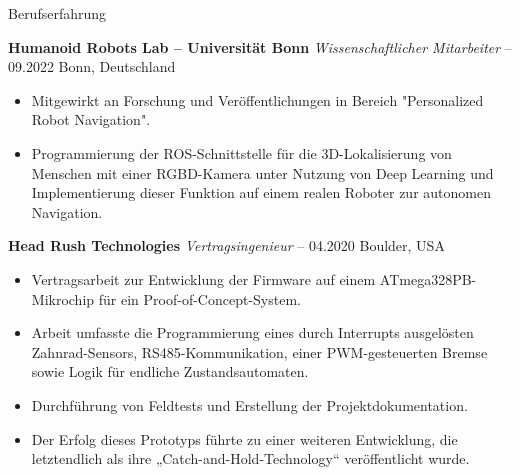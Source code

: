\begin{rubric}{Berufserfahrung}

%
%
\entry*[] \textbf{Humanoid Robots Lab -- Universität Bonn} \hfill \textit{Wissenschaftlicher Mitarbeiter}  -- 09.2022 \hfill Bonn, Deutschland \newline  
\vspace{\CVItemizeHeaderSpacing} \begin{itemize}
	\setlength{\itemsep}{\CVItemizeSpacing}  
	\item Mitgewirkt an Forschung und Veröffentlichungen in Bereich "Personalized Robot Navigation".  
	\item Programmierung der ROS-Schnittstelle für die 3D-Lokalisierung von Menschen mit einer RGBD-Kamera unter Nutzung von Deep Learning und Implementierung dieser Funktion auf einem realen Roboter zur autonomen Navigation.  
\end{itemize}

%
%
\entry*[] \textbf{Head Rush Technologies} \hfill \textit{Vertragsingenieur}  -- 04.2020 \hfill Boulder, USA \newline  
\vspace{\CVItemizeHeaderSpacing} \begin{itemize} 
	\setlength{\itemsep}{\CVItemizeSpacing}  
	\item Vertragsarbeit zur Entwicklung der Firmware auf einem ATmega328PB-Mikrochip für ein Proof-of-Concept-System.  
	\item Arbeit umfasste die Programmierung eines durch Interrupts ausgelösten Zahnrad-Sensors, RS485-Kommunikation, einer PWM-gesteuerten Bremse sowie Logik für endliche Zustandsautomaten.  
	\item Durchführung von Feldtests und Erstellung der Projektdokumentation.  
	\item Der Erfolg dieses Prototyps führte zu einer weiteren Entwicklung, die letztendlich als ihre „Catch-and-Hold-Technology“ veröffentlicht wurde.  
\end{itemize}



\end{rubric}
